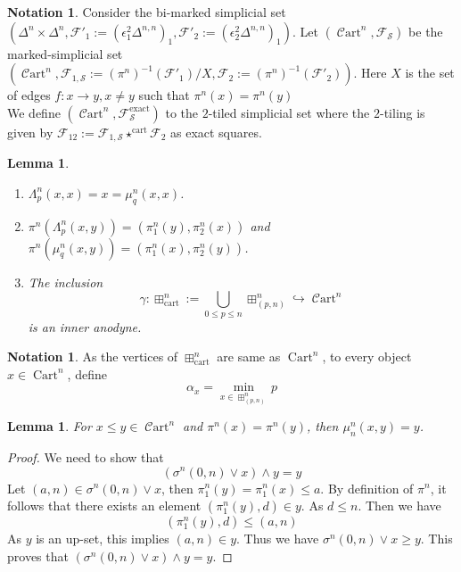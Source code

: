 \documentclass[14pt]{article}
\newtheorem{lemma}[theorem]{Lemma}
\theoremstyle{definition}
\newtheorem{notation}[theorem]{Notation}
\newcommand{\op}[1]{\operatorname{#1}}
\renewcommand{\S}{\mathcal{S}}
\newcommand{\C}{\mathcal{C}}
\newcommand{\F}{\mathcal{F}}
\numberwithin{subsection}{section}
\newcommand{\Cart}{\op{\C art}}
\begin{document}
\begin{notation}
	Consider the bi-marked simplicial set $(\Delta^n \times \Delta^n, \F'_1:=(\epsilon^2_1 \Delta^{n,n})_1, \F'_2:=(\epsilon^2_2 \Delta^{n,n})_1)$. Let $(\Cart^n, \F_{\S})$ be the marked-simplicial set  $(\Cart^n, \F_{1,\S}:=(\pi^n)^{-1}(\F'_1)/X, \F_2:= (\pi^n)^{-1}(\F'_2))$. Here $X$ is the set of edges $f: x \to y , x \neq y$ such that $\pi^n(x) =\pi^n(y)$ \\
	We define $(\Cart^n,\F^{\op{exact}}_{\S})$ to the $2$-tiled simplicial set where the $2$-tiling is given by $\F_{12}:=\F_{1,\S} \star^{\op{cart}} \F_2$ as exact squares.
  
	\end{notation}

\begin{lemma}
    \begin{enumerate}
        \item $\Lambda_p^n(x,x)=x = \mu_q^n(x,x)$.
        \item $\pi^n(\Lambda^n_p(x,y))= (\pi^n_1(y),\pi^n_2(x))$ and $\pi^n(\mu^n_q(x,y)) = (\pi^n_1(x),\pi^n_2(y))$.
        \item The inclusion 
        \begin{equation}
        \gamma : \boxplus^n_{\op{cart}}:=\bigcup_{0 \le p \le n} \boxplus^n_{(p,n)} \hookrightarrow \Cart^n 
        \end{equation}
        is an inner anodyne.
    \end{enumerate}
\end{lemma}
\begin{notation}
    As the vertices of $\boxplus^n_{\op{cart}}$ are same as $\op{Cart}^n$, to every object $x \in \op{Cart}^n$, define
    \begin{equation}
        \alpha_x = \op{min}_{ x \in \boxplus^n_{(p,n)}} p
    \end{equation}
\end{notation}
\begin{lemma}\label{Lambdamulemmaequality}
    For $x\le y \in \Cart^n$ and $\pi^n(x)=\pi^n(y)$, 
    then $\mu^n_n(x,y)=y$.
\end{lemma}
\begin{proof}
We need to show that
\begin{equation}
    (\sigma^n(0,n) \vee x) \wedge y = y
\end{equation}
Let $(a,n) \in \sigma^n(0,n) \vee x$, then $\pi^n_1(y) = \pi^n_1(x) \le a$. By definition of $\pi^n$, it follows that there exists an element $(\pi^n_1(y),d) \in y$. As $d \le n$. Then we have 
\begin{equation}
    (\pi^n_1(y),d) \le (a,n)
\end{equation}
As $y$ is an up-set, this implies $(a,n) \in y$. Thus we have $\sigma^n(0,n) \vee x \ge y$. This proves that $(\sigma^n(0,n) \vee x) \wedge y = y$.
\end{proof}
\end{document}
